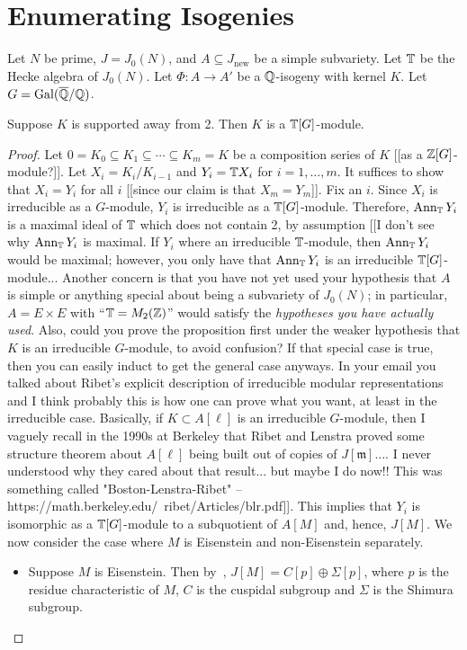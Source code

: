 \documentclass{article}
\begin{document}
\section{Enumerating Isogenies}

Let $N$ be prime, $J=J_0(N)$, and $A\subseteq J_\mathrm{new}$ be a simple
subvariety.  Let $\mathbb{T}$ be the Hecke algebra of $J_0(N)$. Let $\Phi:A\to A'$ be
a $\mathbb{Q}$-isogeny with kernel $K$. Let $G=\operatorname{Gal}(\overline{\mathbb{Q}}/\mathbb{Q})$.

\begin{proposition}
    Suppose $K$ is supported away from 2. Then $K$ is a $\mathbb{T}[G]$-module.
\end{proposition}
\begin{proof}
    Let $0=K_0\subseteq K_1\subseteq \cdots \subseteq K_m = K$ be a composition
    series of $K$ [[as a $\mathbb{Z}[G]$-module?]]. Let $X_i = K_i/K_{i-1}$ and $Y_i = \mathbb{T} X_i$ for
    $i=1,\ldots,m$. It suffices to show that $X_i=Y_i$ for all $i$ [[since our claim is that $X_m=Y_m$]]. Fix an $i$.
    Since $X_i$ is irreducible as a $G$-module, $Y_i$ is irreducible as a
    $\mathbb{T}[G]$-module. Therefore, $\operatorname{Ann}_{\mathbb{T}} Y_i$ is a maximal ideal of $\mathbb{T}$
    which does not contain 2, by assumption [[I don't see why $\operatorname{Ann}_{\mathbb{T}} Y_i$ is maximal.  If $Y_i$ where an irreducible $\mathbb{T}$-module, then $\operatorname{Ann}_{\mathbb{T}} Y_i$ would be maximal; however, you only have that $\operatorname{Ann}_{\mathbb{T}} Y_i$ is an irreducible $\mathbb{T}[G]$-module...  Another concern is that you have not yet used your hypothesis that $A$ is simple or anything special about being a subvariety of $J_0(N)$; in particular, $A=E\times E$ with ``$\mathbb{T}=M_2(\mathbb{Z})$'' would satisfy the {\em hypotheses you have actually used}.  Also, could you prove the proposition first under the weaker hypothesis that $K$ is an irreducible $G$-module, to avoid confusion?  If that special case is true, then you can easily induct to get the general case anyways.    In your email you talked about Ribet's explicit description of irreducible modular representations and I think probably this is how one can prove what you want, at least in the irreducible case.  Basically, if $K\subset A[\ell]$ is an irreducible $G$-module, then I vaguely recall in the 1990s at Berkeley that Ribet and Lenstra proved some structure theorem about $A[\ell]$ being built out of copies of $J[\mathfrak{m}]$....  I never understood why they cared about that result... but maybe I do now!!  This was something called "Boston-Lenstra-Ribet" -- https://math.berkeley.edu/~ribet/Articles/blr.pdf]]. This implies that $Y_i$ is
    isomorphic as a $\mathbb{T}[G]$-module to a subquotient of $A[M]$ and, hence,
    $J[M]$. We now consider the case where $M$ is Eisenstein and non-Eisenstein
    separately.
    \begin{itemize}
        \item
            Suppose $M$ is Eisenstein. Then by~\cite[16.2, pg.
            125]{mazur:eisenstein}, $J[M] = C[p]\oplus\Sigma[p]$, where $p$ is
            the residue characteristic of $M$, $C$ is the cuspidal subgroup and
            $\Sigma$ is the Shimura subgroup.


\end{itemize}
\end{proof}
\end{document}
